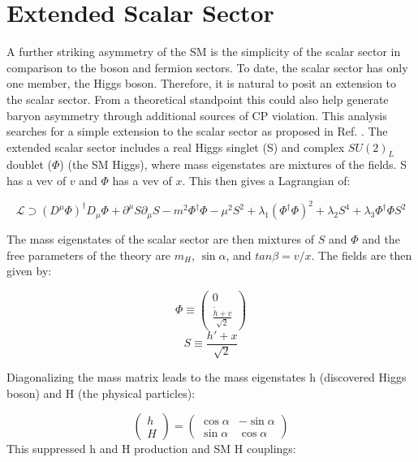 \section{Extended Scalar Sector}
A further striking asymmetry of the SM is the simplicity of the scalar sector in comparison to the boson and fermion sectors. To date, the scalar sector has only one member, the Higgs boson. Therefore, it is natural to posit an extension to the scalar sector. From a theoretical standpoint this could also help generate baryon asymmetry through additional sources of CP violation. This analysis searches for a simple extension to the scalar sector as proposed in Ref. \cite{scalarsinglet}. The extended scalar sector includes a real Higgs singlet (S) and complex $SU(2)_{L}$ doublet ($\Phi$) (the SM Higgs), where mass eigenstates are mixtures of the fields. S has a vev of $v$ and $\Phi$ has a vev of $x$. This then gives a Lagrangian of:

\begin{equation}
\mathcal{L}\supset (D^{\mu}\Phi)^{\dag}D_{\mu}\Phi + \partial^{\mu}S\partial_{\mu}S - m^{2}\Phi^{\dag}\Phi-\mu^{2}S^{2} + \lambda_{1}(\Phi^{\dag}\Phi)^{2} + \lambda_{2}S^{4}+\lambda_{3}\Phi^{\dag}\Phi S^{2}
\end{equation}


The mass eigenstates of the scalar sector are then mixtures of $S$ and $\Phi$ and the free parameters of the theory are $m_{H}$, $\sin\alpha$, and $tan\beta=v/x$. The fields are then given by:

\begin{equation}
\Phi \equiv \begin{pmatrix} 0 \\ \frac{\tilde{h}+v}{\sqrt{2}} \end{pmatrix}
\end{equation}
\begin{equation}
S \equiv \frac{h'+x}{\sqrt{2}}
\end{equation}

Diagonalizing the mass matrix leads to the mass eigenstates h (discovered Higgs boson) and H (the physical particles):

\begin{equation}
\begin{pmatrix} h \\ H \end{pmatrix} = \begin{pmatrix} \cos\alpha &-\sin\alpha \\ \sin\alpha & \cos\alpha \end{pmatrix}
\end{equation}
This suppressed h and H production and SM H couplings:

